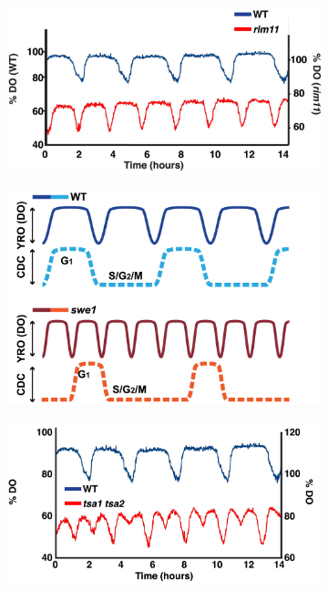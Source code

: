 \begin{figure}[p]
\begin{subfigure}[htpb]{0.4\textwidth}
  \end{subfigure}
  \begin{subfigure}[htpb]{0.4\textwidth}
   \centering
   \includegraphics[width=\textwidth]{caustonMetabolicCyclesYeast2015_2e_adapted}
   \caption{
   }
   \label{fig:intro-ymc-rim11}
  \end{subfigure}
  \begin{subfigure}[htpb]{0.4\textwidth}
   \centering
   \includegraphics[width=\textwidth]{caustonMetabolicCyclesYeast2015_1e_adapted}
   \caption{
   }
   \label{fig:intro-ymc-swe1}
  \end{subfigure}
  \begin{subfigure}[htpb]{0.4\textwidth}
   \centering
   \includegraphics[width=\textwidth]{caustonMetabolicCyclesYeast2015_4a_adapted}

\end{subfigure}
\end{figure}
